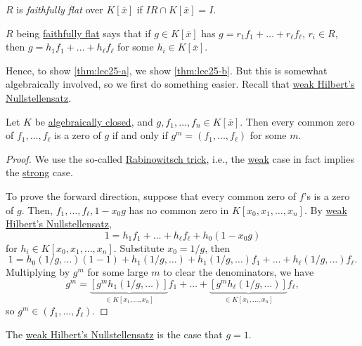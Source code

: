 \begin{notation}\label{not:faithfully-flat}
	\(R\) is \emph{faithfully flat} over \(K[\overline{x} ]\) if \(IR \cap K[\overline{x} ] = I\).
\end{notation}

\begin{intuition}
	\(R\) being \hyperref[not:faithfully-flat]{faithfully flat} says that if \(g\in K[\overline{x} ]\) has \(g = r_1 f_1 + \dots + r_{\ell } f_{\ell } \), \(r_i\in R\), then \(g = h_1 f_1 + \dots + h_{\ell } f_{\ell }  \) for some \(h_i \in K[\overline{x} ]\).
\end{intuition}

Hence, to show \autoref{thm:lec25-a}, we show \autoref{thm:lec25-b}. But this is somewhat algebraically involved, so we first do something easier. Recall that \hyperref[thm:weak-Hilbert-Nullstellensatz]{weak Hilbert's Nullstellensatz}.

\begin{theorem}\label{thm:strong-Hilbert-Nullstellensatz}
	Let \(K\) be \hyperref[def:algebraically-closed]{algebraically closed}, and \(g, f_1, \dots , f_n\in K[\overline{x} ]\). Then every common zero of \(f_1, \dots , f_{\ell } \) is a zero of \(g\) if and only if \(g^m = (f_1, \dots , f_{\ell } )\) for some \(m\).
\end{theorem}
\begin{proof}
	We use the so-called \href{https://en.wikipedia.org/wiki/Rabinowitsch_trick}{Rabinowitsch trick}, i.e., the \hyperref[thm:weak-Hilbert-Nullstellensatz]{weak} case in fact implies the \hyperref[thm:strong-Hilbert-Nullstellensatz]{strong} case.

	To prove the forward direction, suppose that every common zero of \(f\)'s is a zero of \(g\). Then, \(f_1, \dots , f_{\ell }, 1 - x_0 g \) has no common zero in \(K[x_0, x_1, \dots , x_n]\). By \hyperref[thm:weak-Hilbert-Nullstellensatz]{weak Hilbert's Nullstellensatz},
	\[
		1 = h_1 f_1 + \dots + h_{\ell } f_{\ell } + h_0 (1 - x_0 g)
	\]
	for \(h_i \in K[x_0, x_1, \dots , x_n]\). Substitute \(x_0 = 1 / g\), then
	\[
		1 = h_0(1 / g, \dots ) (1 - 1) + h_1 ( 1/g, \dots ) + h_1(1 / g, \dots )f_1 + \dots + h_{\ell } (1 / g, \dots ) f_{\ell }.
	\]
	Multiplying by \(g^m\) for some large \(m\) to clear the denominators, we have
	\[
		g^m = \underbrace{[g^m h_1(1 / g, \dots )]}_{\in K[x_1, \dots , x_n]} f_1 + \dots + \underbrace{[g^m h_{\ell } (1 / g, \dots )]}_{\in K[x_1, \dots , x_n]}f_{\ell },
	\]
	so \(g^m\in (f_1, \dots ,f_{\ell } )\).
\end{proof}

\begin{note}
	The \hyperref[thm:weak-Hilbert-Nullstellensatz]{weak Hilbert's Nullstellensatz} is the case that \(g = 1\).
\end{note}